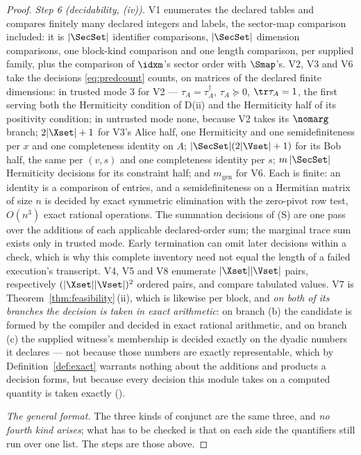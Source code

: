 \begin{proof}
\emph{Step 6 (decidability, (iv)).} V1 enumerates the declared tables and
compares finitely many declared integers and labels, the sector-map
comparison included: it is $|\SecSet|$ identifier comparisons, $|\SecSet|$
dimension comparisons, one block-kind comparison and one length comparison,
per supplied family, plus the comparison of $\idxm$'s sector order with
$\Smap$'s. V2, V3 and V6 take the decisions \eqref{eq:predcount} counts, on
matrices of the declared finite dimensions: in trusted mode $3$ for V2 ---
$\tau_A=\tau_A^{\dagger}$, $\tau_A\succeq0$, $\tr\tau_A=1$, the first serving
both the Hermiticity condition of D(ii) and the Hermiticity half of its
positivity condition; in untrusted mode none, because V2 takes its
$\nomarg$ branch; $2|\Xset|+1$ for V3's Alice half, one Hermiticity and one
semidefiniteness per $x$ and one completeness identity on $A$;
$|\SecSet|(2|\Vset|+1)$ for its Bob half, the same per $(v,s)$ and one
completeness identity per $s$; $m\,|\SecSet|$ Hermiticity decisions for its
constraint half; and $m_{\text{gen}}$ for V6. Each is finite: an identity is
a comparison of entries, and a semidefiniteness on a Hermitian matrix of size
$n$ is decided by exact symmetric elimination with the zero-pivot row test,
$O(n^3)$ exact rational operations. The summation decisions of (S) are one
pass over the additions of each applicable declared-order sum; the marginal
trace sum exists only in trusted mode. Early termination can omit later
decisions within a check, which is why this complete inventory need not
equal the length of a failed execution's transcript. V4, V5 and V8 enumerate
$|\Xset||\Vset|$ pairs, respectively $(|\Xset||\Vset|)^2$ ordered pairs, and
compare tabulated values. V7 is Theorem~\ref{thm:feasibility}\,(ii), which is likewise
per block, and \emph{on both of its branches the decision is taken in exact
arithmetic}: on branch (b) the candidate is formed by the compiler and decided
in exact rational arithmetic, and on branch (c) the supplied witness's
membership is decided exactly on the dyadic numbers it declares --- not
because those numbers are exactly representable, which by
Definition~\ref{def:exact} warrants nothing about the additions and products
a decision forms, but because every decision this module takes on a computed
quantity is taken exactly ().

\emph{The general format.} The three kinds of conjunct are the same three, and
\emph{no fourth kind arises}; what has to be checked is that on each side the
quantifiers still run over one list. The steps are those above.


\end{proof}
